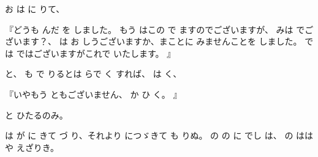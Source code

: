 お
は
に
りて、

『どうも
んだ
を
しました。
もう
はこの
で
ますのでございますが、
みは
でございます？、
は
お
しうございますか、まことに
みませんことを
しました。
では
ではございますがこれで
いたします。
』

と、
も
で
りるとは
らで
く
すれば、
は
く、

『いやもう
ともございません、
か
ひ
く。
』

と
ひたるのみ。

は
が
に
きて
づ
り、それより
につゞきて
も
りぬ。
の
の
に
でし
は、
の
ははや
えざりき。

